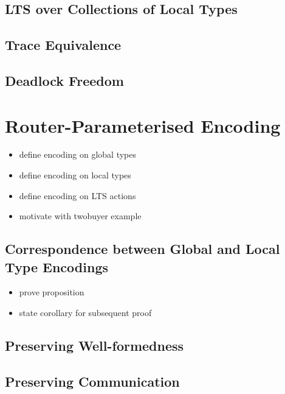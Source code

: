 \subsection{LTS over Collections of Local Types}

\subsection{Trace Equivalence}

\subsection{Deadlock Freedom}

\section{Router-Parameterised Encoding}

\begin{itemize}
\item define encoding on global types
\item define encoding on local types
\item define encoding on LTS actions
\item motivate with twobuyer example
\end{itemize}

\subsection{Correspondence between Global and Local Type Encodings}
\begin{itemize}
\item prove proposition
\item state corollary for subsequent proof
\end{itemize}

\subsection{Preserving Well-formedness}

\subsection{Preserving Communication}